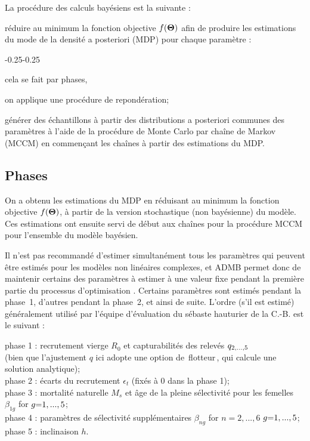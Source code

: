\documentclass[11pt]{book}
\def\bfTh{{\bf \Theta}}%
\newcommand{\angL}{\guillemotleft\,}
\newcommand{\angR}{\,\guillemotright}
\def\bfTh{{\bf \Theta}}          %
\def\hsd{\hspace*{1ex}}
\begin{document}
La proc\'{e}dure des calculs bay\'{e}siens est la suivante :
\begin{enumerate_itemize}{}{}
  \item r\'{e}duire au minimum la fonction objective $f(\bfTh)$ afin de produire les estimations du mode de la densit\'{e} a posteriori (MDP) pour chaque param\`{e}tre :
  \begin{enumerate_itemize}{-0.25}{-0.25}
    \item cela se fait par phases,
    \item on applique une proc\'{e}dure de repond\'{e}ration;
  \end{enumerate_itemize}
  \item g\'{e}n\'{e}rer des \'{e}chantillons \`{a} partir des distributions a posteriori communes des param\`{e}tres \`{a} l'aide de la proc\'{e}dure de Monte Carlo par cha\^{i}ne de Markov (MCCM) en commen\c{c}ant les cha\^{i}nes \`{a} partir des estimations du MDP.
\end{enumerate_itemize}

\subsection{Phases}

On a obtenu les estimations du MDP en r\'{e}duisant au minimum la fonction objective $f(\bfTh)$, \`{a} partir de la version stochastique (non bay\'{e}sienne) du mod\`{e}le.
Ces estimations ont ensuite servi de d\'{e}but aux cha\^{i}nes pour la proc\'{e}dure MCCM pour l'ensemble du mod\`{e}le bay\'{e}sien.

Il n'est pas recommand\'{e} d'estimer simultan\'{e}ment tous les param\`{e}tres qui peuvent \^{e}tre estim\'{e}s pour les mod\`{e}les non lin\'{e}aires complexes, et ADMB permet donc de maintenir certains des param\`{e}tres \`{a} estimer \`{a} une valeur fixe pendant la premi\`{e}re partie du processus d'optimisation \citet{ADMB:2009}.
Certains param\`{e}tres sont estim\'{e}s pendant la phase~1, d'autres pendant la phase~2, et ainsi de suite.
L'ordre (s'il est estim\'{e}) g\'{e}n\'{e}ralement utilis\'{e} par l'\'{e}quipe d'\'{e}valuation du s\'{e}baste hauturier de la C.-B. est le suivant :

\begin{changemargin}{0.25in}{0.25in}{0.5ex}
phase 1 : recrutement vierge $R_0$ et capturabilit\'{e}s des relev\'{e}s $q_{2,...,5}$\\
  \hsd (bien que l'ajustement $q$ ici adopte une option de \angL flotteur\angR{}, qui calcule une solution analytique);\\
phase 2 : \'{e}carts du recrutement $\epsilon_t$ (fix\'{e}s \`{a} 0 dans la phase 1);\\
phase 3 : mortalit\'{e} naturelle $M_{s}$ et \^{a}ge de la pleine s\'{e}lectivit\'{e} pour les femelles $\beta_{1g}$ for $g{=}1,...,5$;\\
phase 4 : param\`{e}tres de s\'{e}lectivit\'{e} suppl\'{e}mentaires $\beta_{ng}$ for $n{=}2,...,6$ $g{=}1,...,5$;\\
phase 5 : inclinaison $h$.
\end{changemargin}
\end{document}
